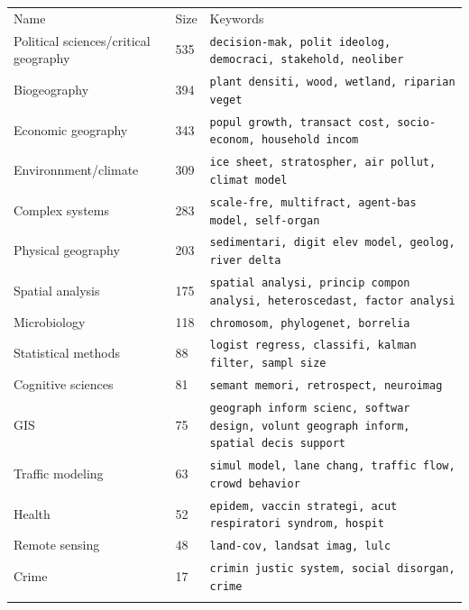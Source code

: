 \begin{table}
\hspace{-1cm}
\begin{tabular}{lll}
\hline\noalign{\smallskip}
Name & Size & Keywords  \\
\noalign{\smallskip}\hline\noalign{\smallskip}
Political sciences/critical geography & 535 & \texttt{decision-mak, polit ideolog, democraci, stakehold, neoliber} \\
Biogeography & 394 & \texttt{plant densiti, wood, wetland, riparian veget} \\
Economic geography & 343 &  \texttt{popul growth, transact cost, socio-econom, household incom} \\
Environnment/climate & 309 & \texttt{ice sheet, stratospher, air pollut, climat model} \\
Complex systems & 283 & \texttt{scale-fre, multifract, agent-bas model, self-organ} \\
Physical geography & 203 & \texttt{sedimentari, digit elev model, geolog, river delta} \\
Spatial analysis & 175 & \texttt{spatial analysi, princip compon analysi, heteroscedast, factor analysi} \\
Microbiology & 118 & \texttt{chromosom, phylogenet, borrelia} \\
Statistical methods & 88 & \texttt{logist regress, classifi, kalman filter, sampl size} \\
Cognitive sciences & 81 & \texttt{semant memori, retrospect, neuroimag} \\
GIS & 75 & \texttt{geograph inform scienc, softwar design, volunt geograph inform, spatial decis support} \\
Traffic modeling & 63 & \texttt{simul model, lane chang, traffic flow, crowd behavior} \\
Health & 52 & \texttt{epidem, vaccin strategi, acut respiratori syndrom, hospit} \\
Remote sensing & 48 & \texttt{land-cov, landsat imag, lulc} \\
Crime & 17 & \texttt{crimin justic system, social disorgan, crime} \\
\noalign{\smallskip}\hline
\end{tabular}
\end{table}


